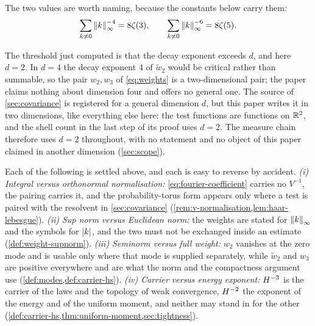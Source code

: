 The two values are worth naming, because the constants below carry them:
\[
  \sum_{k\ne0}\left\| k \right\|_\infty^{-4}=8\zeta(3),
  \qquad
  \sum_{k\ne0}\left\| k \right\|_\infty^{-6}=8\zeta(5).
\]

\begin{remark}\label{rem:dimension}
The threshold just computed is that the decay exponent exceeds $d$, and here
$d=2$. In $d=4$ the decay exponent $4$ of $\widetilde w_2$ would be critical
rather than summable, so the pair $w_2,w_3$ of \eqref{eq:weights} is a
two-dimensional pair; the paper claims nothing about dimension four and offers
no general one. The source of
\cref{sec:covariance} is registered for a general dimension $d$, but this paper
writes it in two dimensions, like everything else here: the test functions are
functions on $\mathbb{R}^2$, and the shell count in the last step of its proof uses
$d=2$. The measure chain therefore uses $d=2$ throughout, with no statement and
no object of this paper claimed in another dimension (\cref{sec:scope}).
\end{remark}

\begin{remark}\label{rem:conventions}
Each of the following is settled above, and each is easy to reverse by accident.
\emph{(i) Integral versus orthonormal normalisation:} \eqref{eq:fourier-coefficient}
carries no $V^{-1}$, the pairing carries it, and the probability-torus form
appears only where a test is paired with the resolvent in \cref{sec:covariance}
(\cref{rem:v-normalisation,lem:haar-lebesgue}). \emph{(ii) Sup norm versus
Euclidean norm:} the weights are stated for $\left\| k \right\|_\infty$ and the symbols
for $\left| k \right|$, and the two must not be exchanged inside an estimate
(\cref{def:weight-supnorm}). \emph{(iii) Seminorm versus full weight:} $w_2$
vanishes at the zero mode and is usable only where that mode is supplied
separately, while $\widetilde w_2$ and $w_3$ are positive everywhere and are
what the norm and the compactness argument use
(\cref{def:modes,def:carrier-hs}). \emph{(iv) Carrier versus energy exponent:}
$H^{-3}$ is the carrier of the laws and the topology of weak convergence,
$H^{-2}$ the exponent of the energy and of the uniform moment, and neither may
stand in for the other
(\cref{def:carrier-hs,thm:uniform-moment,sec:tightness}).
\end{remark}
